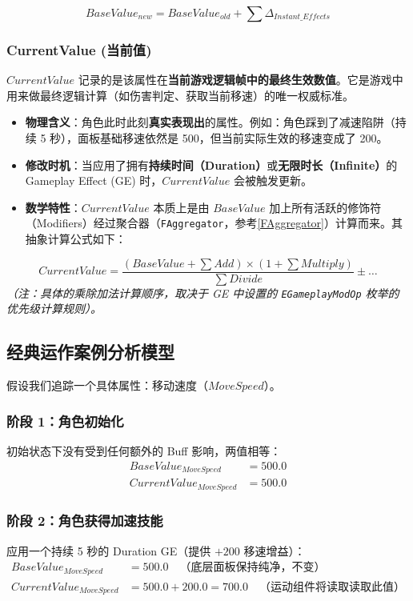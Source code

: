 \begin{equation*}
	BaseValue_{new} = BaseValue_{old} + \sum \Delta_{Instant\_Effects}
\end{equation*}

\subsubsection{CurrentValue (当前值)}
$CurrentValue$ 记录的是该属性在\textbf{当前游戏逻辑帧中的最终生效数值}。它是游戏中用来做最终逻辑计算（如伤害判定、获取当前移速）的唯一权威标准。

\begin{itemize}
	\item \textbf{物理含义}：角色此时此刻\textbf{真实表现出}的属性。例如：角色踩到了减速陷阱（持续 5 秒），面板基础移速依然是 500，但当前实际生效的移速变成了 200。
	\item \textbf{修改时机}：当应用了拥有\textbf{持续时间（Duration）}或\textbf{无限时长（Infinite）}的 Gameplay Effect (GE) 时，$CurrentValue$ 会被触发更新。
	\item \textbf{数学特性}：$CurrentValue$ 本质上是由 $BaseValue$ 加上所有活跃的修饰符（Modifiers）经过聚合器（\texttt{FAggregator}，参考\ref{FAggregator}）计算而来。其抽象计算公式如下：
\end{itemize}

\begin{equation*}
	CurrentValue = \frac{\left(BaseValue + \sum Add\right) \times \left(1 + \sum Multiply\right)}{\sum Divide} \pm \dots
\end{equation*}
\textit{（注：具体的乘除加法计算顺序，取决于 GE 中设置的 \texttt{EGameplayModOp} 枚举的优先级计算规则）。}

\subsection{经典运作案例分析模型}
假设我们追踪一个具体属性：移动速度（$MoveSpeed$）。

\subsubsection{阶段 1：角色初始化}
初始状态下没有受到任何额外的 Buff 影响，两值相等：
\begin{align*}
	BaseValue_{MoveSpeed} &= 500.0 \\
	CurrentValue_{MoveSpeed} &= 500.0
\end{align*}

\subsubsection{阶段 2：角色获得加速技能}
应用一个持续 5 秒的 Duration GE（提供 $+200$ 移速增益）：
\begin{align*}
	BaseValue_{MoveSpeed} &= 500.0 \quad \text{（底层面板保持纯净，不变）} \\
	CurrentValue_{MoveSpeed} &= 500.0 + 200.0 = 700.0 \quad \text{（运动组件将读取读取此值）}
\end{align*}

